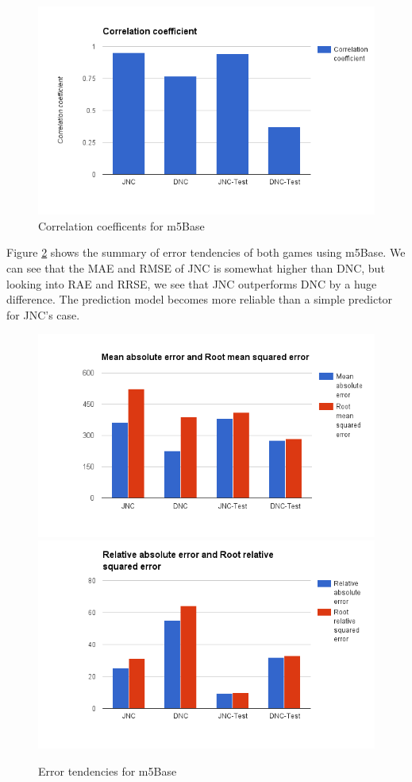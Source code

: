 \begin{figure}[h!]
\centering
\includegraphics[scale=0.4]{figures/m5Base_1.png} 
\caption{Correlation coefficents for m5Base}
\label{fig:correl_m5base}
\end{figure}

Figure \ref{fig:error_m5base} shows the summary of error tendencies of both games using m5Base. We can see that the MAE and RMSE of JNC is somewhat higher than DNC, but looking into RAE and RRSE, we see that JNC outperforms DNC by a huge difference. The prediction model becomes more reliable than a simple predictor for JNC's case.

\begin{figure}[h!]
\centering
\includegraphics[scale=0.4]{figures/m5Base_2.png} 
\includegraphics[scale=0.4]{figures/m5Base_3.png} 
\caption{Error tendencies for m5Base}
\label{fig:error_m5base}
\end{figure}

